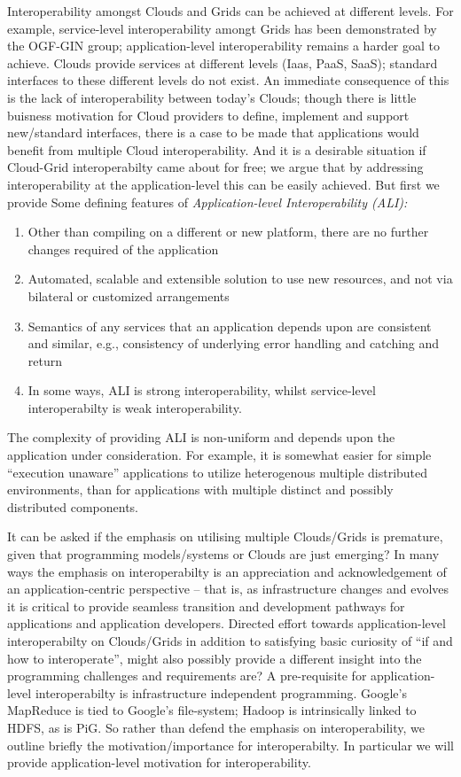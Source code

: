 \documentclass[conference,final]{IEEEtran}
\begin{document}
Interoperability amongst Clouds and Grids can be achieved at different
levels. For example, service-level interoperability amongt Grids has
been demonstrated by the OGF-GIN group; application-level
interoperability remains a harder goal to achieve.  Clouds provide
services at different levels (Iaas, PaaS, SaaS); standard interfaces
to these different levels do not exist. An immediate consequence of
this is the lack of interoperability between today's Clouds; though
there is little buisness motivation for Cloud providers to define,
implement and support new/standard interfaces, there is a case to be
made that applications would benefit from multiple Cloud
interoperability.  And it is a desirable situation if Cloud-Grid
interoperabilty came about for free; we argue that by addressing
interoperability at the application-level this can be easily achieved.
But first we provide Some defining features of {\it Application-level
  Interoperability (ALI):}
\begin{enumerate}
\item Other than compiling on a different or new platform, there are no
  further changes required of the application
\item Automated, scalable and extensible solution to use new resources,
  and not via  bilateral or customized arrangements
\item Semantics of any services that an application depends upon are
  consistent and similar, e.g., consistency of underlying error
  handling and catching and return
\item In some ways, ALI is strong interoperability, whilst
  service-level interoperabilty is weak interoperability.
\end{enumerate}

The complexity of providing ALI is non-uniform and depends upon the
application under consideration. For example, it is somewhat easier
for simple ``execution unaware'' applications to utilize heterogenous
multiple distributed environments, than for applications with multiple
distinct and possibly distributed components.

It can be asked if the emphasis on utilising multiple Clouds/Grids is
premature, given that programming models/systems or Clouds are just
emerging? In many ways the emphasis on interoperabilty is an
appreciation and acknowledgement of an application-centric perspective
-- that is, as infrastructure changes and evolves it is critical to
provide seamless transition and development pathways for applications
and application developers. Directed effort towards application-level
interoperabilty on Clouds/Grids in addition to satisfying basic
curiosity of ``if and how to interoperate'', might also possibly
provide a different insight into the programming challenges and
requirements are?  A pre-requisite for application-level
interoperabilty is infrastructure independent programming. Google's
MapReduce is tied to Google's file-system; Hadoop is intrinsically
linked to HDFS, as is PiG.  So rather than defend the emphasis on
interoperability, we outline briefly the motivation/importance for
interoperabilty. In particular we will provide application-level
motivation for interoperability.
\end{document}
